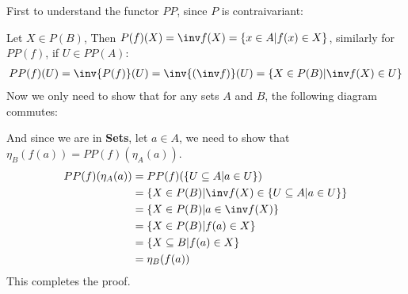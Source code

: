First to understand the functor $PP$, since $P$ is contraivariant:
\begin{center}
\end{center}
Let $X \in P(B)$, Then $P(f)(X) = \inv f(X) = \{x \in A| f(x) \in X\}$, similarly for $PP(f)$, if $U \in PP(A)$:
\begin{gather*}
    PP(f)(U) = \inv{P(f)}(U) = \inv{(\inv f)}(U) = \{X \in P(B)| \inv f(X) \in U \}
\end{gather*}
Now we only need to show that for any sets $A$ and $B$, the following diagram commutes:
\begin{center}
\end{center}
And since we are in \textbf{Sets}, let $a \in A$, we need to show that $\eta_B(f(a)) = PP(f)(\eta_A(a))$.
\begin{equation*}
    \begin{split}
        PP(f)(\eta_A(a)) & = PP(f) (\{U \subseteq A| a \in U\}) \\
        & = \{X \in P(B) | \inv f(X) \in \{U \subseteq A | a \in U\}\} \\
        & = \{X \in P(B) | a \in \inv f(X)\} \\ 
        & = \{X \in P(B) | f(a) \in X\} \\
        & = \{X \subseteq B | f(a) \in X\} \\
        & = \eta_B(f(a))
    \end{split}
\end{equation*}
This completes the proof.